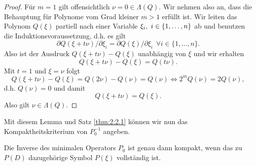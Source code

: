 \begin{proof}
\item Für $m=1$ gilt offensichtlich $\nu = 0 \in \Lambda(Q)$. Wir nehmen also an, dass die Behauptung für Polynome vom Grad kleiner $m>1$ erfüllt ist. Wir leiten das Polynom $Q(\xi)$ partiell nach einer Variable $\xi_i, \ i \in \{1,\ldots,n\}$ ab und benutzen die Induktionsvoraussetzung, d.h. es gilt
\begin{equation}
\partial Q(\xi + t \nu)/ \partial \xi_i = \partial Q(\xi)/\partial \xi_i \ \ \forall i \in \{1,\ldots,n\}.
\end{equation}
Also ist der Ausdruck $Q(\xi + t \nu) - Q(\xi)$ unabhängig von $\xi$ und wir erhalten
\begin{equation}
Q(\xi + t \nu) - Q(\xi) = Q(t \nu).
\end{equation}
Mit $t=1$ und $\xi=\nu$ folgt
\begin{equation}
Q(\xi + t\nu) - Q(\xi) = Q(2 \nu) - Q(\nu)= Q(\nu) \Leftrightarrow 2^m Q(\nu) = 2 Q(\nu),
\end{equation}
d.h. $Q(\nu)=0$ und damit 
\begin{equation}
Q(\xi + t\nu) = Q(\xi).
\end{equation}
Also gilt $\nu \in \Lambda(Q)$.
\end{proof}
Mit diesem Lemma und Satz \ref{thm:2:2.1} können wir nun das Kompaktheitskriterium von $P_0^{-1}$ angeben.
\begin{thm}
Die Inverse des minimalen Operators $P_0$ ist genau dann kompakt, wenn das zu $P(D)$ dazugehörige Symbol $P(\xi)$ vollständig ist.
\end{thm}
